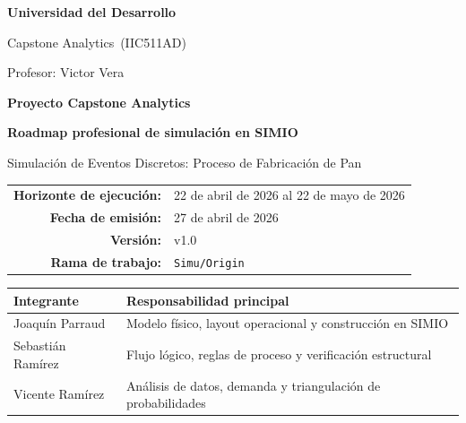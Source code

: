 \documentclass[11pt,letterpaper]{article}
\newcommand{\curso}{Capstone Analytics}
\newcommand{\codigo}{IIC511AD}
\newcommand{\profesor}{Victor Vera}
\newcommand{\universidad}{Universidad del Desarrollo}
\newcommand{\fechaemision}{27 de abril de 2026}
\newcommand{\horizonte}{22 de abril de 2026 al 22 de mayo de 2026}
\newcommand{\versiondoc}{v1.0}
\begin{document}
\begin{titlepage}
  \centering
  \vspace*{0.5cm}

  \vspace{1.2cm}
  {\Large \textbf{\universidad}\par}
  \vspace{0.25cm}
  {\large \curso\ (\codigo)\par}
  {\large Profesor: \profesor\par}

  \vspace{1.4cm}
  {\Huge \textbf{Proyecto Capstone Analytics}\par}
  \vspace{0.45cm}
  {\LARGE \textbf{Roadmap profesional de simulación en SIMIO}\par}
  \vspace{0.3cm}
  {\Large Simulación de Eventos Discretos: Proceso de Fabricación de Pan\par}

  \vspace{1.0cm}
  \begin{tabular}{rl}
    \textbf{Horizonte de ejecución:} & \horizonte \\
    \textbf{Fecha de emisión:} & \fechaemision \\
    \textbf{Versión:} & \versiondoc \\
    \textbf{Rama de trabajo:} & \texttt{Simu/Origin} \\
  \end{tabular}

  \vfill
  \begin{tabular}{ll}
    \toprule
    \textbf{Integrante} & \textbf{Responsabilidad principal} \\
    \midrule
    Joaquín Parraud & Modelo físico, layout operacional y construcción en SIMIO \\
    Sebastián Ramírez & Flujo lógico, reglas de proceso y verificación estructural \\
    Vicente Ramírez & Análisis de datos, demanda y triangulación de probabilidades \\
    \bottomrule
  \end{tabular}

  \vspace*{0.5cm}
\end{titlepage}
\end{document}
